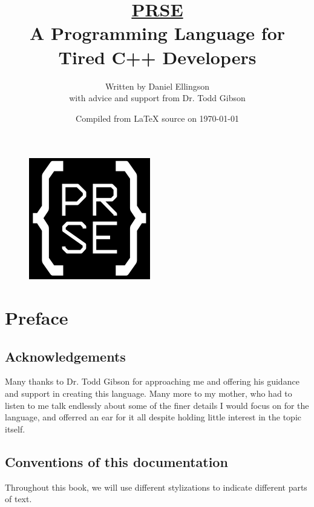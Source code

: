 \documentclass[letterpaper, 12pt]{article}
\begin{document}
\title{\underline{PRSE}\\ A Programming Language for Tired C++ Developers}
\author{Written by Daniel Ellingson\\with advice and support from Dr. Todd Gibson}
\date{Compiled from {\LaTeX} source on \today}
\maketitle

\newpage

\begin{figure}
   \begin{center}
      \vspace*{-8cm}
      \includegraphics{logo}
   \end{center}
\end{figure}
\clearpage

\newpage

\tableofcontents

\newpage

\section{Preface}
\subsection{Acknowledgements}
Many thanks to Dr. Todd Gibson for approaching me and offering his guidance and support in creating
this language. Many more to my mother, who had to listen to me talk endlessly about some of the finer
details I would focus on for the language, and offerred an ear for it all despite holding little interest
in the topic itself.
\subsection{Conventions of this documentation}
Throughout this book, we will use different stylizations to indicate different parts of text.\linebreak
\end{document}
